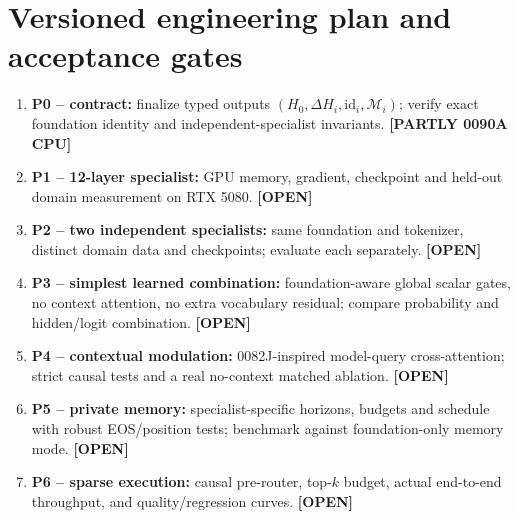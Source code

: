 \documentclass[11pt,letterpaper]{article}
\newcommand{\tagg}[1]{\textsf{\footnotesize\color{sea}\textbf{[#1]}}}
\begin{document}
\section{Versioned engineering plan and acceptance gates}
\label{sec:plan}
\begin{enumerate}
\item \textbf{P0 -- contract:} finalize typed outputs $(H_0,\Delta H_i,\mathrm{id}_i,\mathcal M_i)$; verify exact foundation identity and independent-specialist invariants. \tagg{PARTLY 0090A CPU}
\item \textbf{P1 -- 12-layer specialist:} GPU memory, gradient, checkpoint and held-out domain measurement on RTX 5080. \tagg{OPEN}
\item \textbf{P2 -- two independent specialists:} same foundation and tokenizer, distinct domain data and checkpoints; evaluate each separately. \tagg{OPEN}
\item \textbf{P3 -- simplest learned combination:} foundation-aware global scalar gates, no context attention, no extra vocabulary residual; compare probability and hidden/logit combination. \tagg{OPEN}
\item \textbf{P4 -- contextual modulation:} 0082J-inspired model-query cross-attention; strict causal tests and a real no-context matched ablation. \tagg{OPEN}
\item \textbf{P5 -- private memory:} specialist-specific horizons, budgets and schedule with robust EOS/position tests; benchmark against foundation-only memory mode. \tagg{OPEN}
\item \textbf{P6 -- sparse execution:} causal pre-router, top-$k$ budget, actual end-to-end throughput, and quality/regression curves. \tagg{OPEN}
\end{enumerate}
\end{document}

